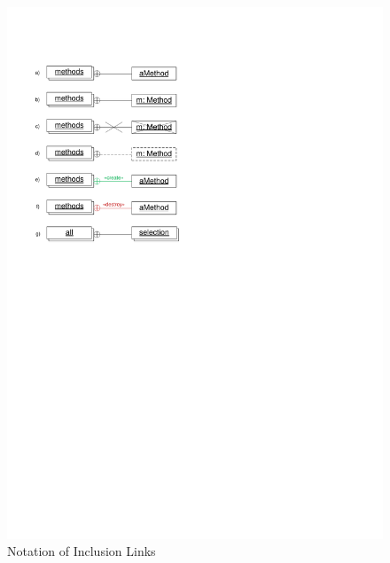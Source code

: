 \begin{figure}[htb]
	\begin{minipage}{.43\textwidth}
		\centering
		\includegraphics[width=\linewidth]{figures/InclusionLinks}
    \caption{Notation of Inclusion Links}
    \label{fig:InlucionLinks}
	\end{minipage}
  \hfill
  \begin{minipage}{.47\textwidth}
  	\centering

\end{minipage}
\end{figure}
